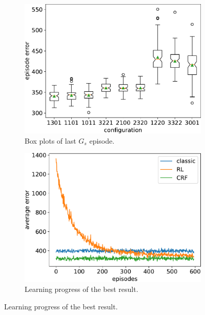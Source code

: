 \newcommand{\figfactor}{0.45}
\begin{figure}[t!]
  \bigskip
  \begin{subfigure}[t]{\figfactor\textwidth}
    \centering
    \includegraphics[width=\textwidth]{papers/coordination2022/img/box-all.pdf}
    \caption{Box plots of last $G_s$ episode.}
    \label{subfig:boxplot}
  \end{subfigure}  
  \hfill
  \begin{subfigure}[t]{\figfactor\textwidth}
    \centering
    \includegraphics[width=\textwidth]{papers/coordination2022/img/mean-error-left.pdf}
    \caption{Learning progress of the best result.}
    \label{subfig:mean-error-over-episode}
  \end{subfigure}
  \bigskip
  

\end{figure}
